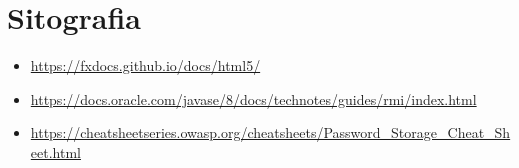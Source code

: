 \section{Sitografia}
\begin{itemize}
    \item \url{https://fxdocs.github.io/docs/html5/}
    \item \url{https://docs.oracle.com/javase/8/docs/technotes/guides/rmi/index.html}
    \item \url{https://cheatsheetseries.owasp.org/cheatsheets/Password_Storage_Cheat_Sheet.html}
\end{itemize}
